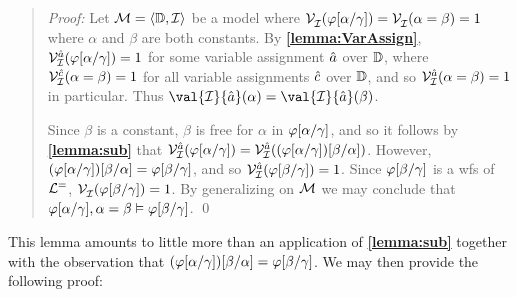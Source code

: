 \begin{quote} 
  \textit{Proof:} Let $\mathcal{M}=\langle\mathbb{D},\mathcal{I}\rangle$ be a model where $\mathcal{V}_{\mathcal{I}}^{}(\varphi[\alpha/\gamma]) = \mathcal{V}_{\mathcal{I}}^{}(\alpha = \beta) = 1$ where $\alpha$ and $\beta$ are both constants. 
  By \textbf{\ref{lemma:VarAssign}}, $\mathcal{V}_{\mathcal{I}}^{\hat{a}}(\varphi[\alpha/\gamma])=1$ for some variable assignment $\hat{a}$ over $\mathbb{D}$, where $\mathcal{V}_{\mathcal{I}}^{\hat{c}}(\alpha=\beta)=1$ for all variable assignments $\hat{c}$ over $\mathbb{D}$, and so $\mathcal{V}_{\mathcal{I}}^{\hat{a}}(\alpha=\beta)=1$ in particular.
  Thus $\val{\I}{\va{a}}(\alpha)=\val{\I}{\va{a}}(\beta)$.

  Since $\beta$ is a constant, $\beta$ is free for $\alpha$ in $\varphi[\alpha/\gamma]$, and so it follows by \textbf{\ref{lemma:sub}} that $\mathcal{V}_{\mathcal{I}}^{\hat{a}}(\varphi[\alpha/\gamma]) = \mathcal{V}_{\mathcal{I}}^{\hat{a}}((\varphi[\alpha/\gamma])[\beta/\alpha])$.
  However, $(\varphi[\alpha/\gamma])[\beta/\alpha]=\varphi[\beta/\gamma]$, and so $\mathcal{V}_{\mathcal{I}}^{\hat{a}}(\varphi[\beta/\gamma])=1$.
  Since $\varphi[\beta/\gamma]$ is a wfs of $\mathcal{L}^{=}$, $\mathcal{V}_{\mathcal{I}}^{}(\varphi[\beta/\gamma])=1$. 
  By generalizing on $\mathcal{M}$ we may conclude that $\varphi[\alpha/\gamma], \alpha = \beta \vDash \varphi[\beta/\gamma]$. 
  \qed
\end{quote}

This lemma amounts to little more than an application of \textbf{\ref{lemma:sub}} together with the observation that $(\varphi[\alpha/\gamma])[\beta/\alpha]=\varphi[\beta/\gamma]$.
We may then provide the following proof:





